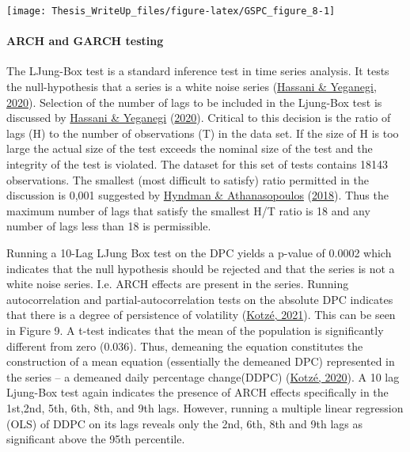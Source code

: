 \documentclass[11pt,preprint, authoryear]{elsarticle}
\let\origfigure\figure
\let\endorigfigure\endfigure
\renewenvironment{figure}[1][2] {
    \expandafter\origfigure\expandafter[H]
} {
    \endorigfigure
}
\numberwithin{equation}{section}
\numberwithin{figure}{section}
\numberwithin{table}{section}
\begin{document}
\begin{figure}[H]

{\centering \texttt{[image: Thesis\_WriteUp\_files/figure-latex/GSPC\_figure\_8-1]} 

}

\caption{stdVolControlled and absolute LogDiff \label{Figure8}}\label{fig:GSPC_figure_8}
\end{figure}

\hypertarget{arch-and-garch-testing}{%
\paragraph{\texorpdfstring{ARCH and GARCH testing
\label{ARCHandGARCH}}{ARCH and GARCH testing }}\label{arch-and-garch-testing}}

The LJung-Box test is a standard inference test in time series analysis.
It tests the null-hypothesis that a series is a white noise series
(\protect\hyperlink{ref-hassani2020selecting}{Hassani \& Yeganegi,
2020}). Selection of the number of lags to be included in the Ljung-Box
test is discussed by
\protect\hyperlink{ref-hassani2020selecting}{Hassani \& Yeganegi}
(\protect\hyperlink{ref-hassani2020selecting}{2020}). Critical to this
decision is the ratio of lags (H) to the number of observations (T) in
the data set. If the size of H is too large the actual size of the test
exceeds the nominal size of the test and the integrity of the test is
violated. The dataset for this set of tests contains 18143 observations.
The smallest (most difficult to satisfy) ratio permitted in the
discussion is 0,001 suggested by
\protect\hyperlink{ref-hyndman2018forecasting}{Hyndman \&
Athanasopoulos} (\protect\hyperlink{ref-hyndman2018forecasting}{2018}).
Thus the maximum number of lags that satisfy the smallest H/T ratio is
18 and any number of lags less than 18 is permissible.

Running a 10-Lag LJung Box test on the DPC yields a p-value of 0.0002
which indicates that the null hypothesis should be rejected and that the
series is not a white noise series. I.e. ARCH effects are present in the
series. Running autocorrelation and partial-autocorrelation tests on the
absolute DPC indicates that there is a degree of persistence of
volatility (\protect\hyperlink{ref-kotze2021volatility}{Kotzé, 2021}).
This can be seen in Figure 9. A t-test indicates that the mean of the
population is significantly different from zero (0.036). Thus, demeaning
the equation constitutes the construction of a mean equation
(essentially the demeaned DPC) represented in the series -- a demeaned
daily percentage change(DDPC)
(\protect\hyperlink{ref-kotze2020univariate}{Kotzé, 2020}). A 10 lag
Ljung-Box test again indicates the presence of ARCH effects specifically
in the 1st,2nd, 5th, 6th, 8th, and 9th lags. However, running a multiple
linear regression (OLS) of DDPC on its lags reveals only the 2nd, 6th,
8th and 9th lags as significant above the 95th percentile.
\end{document}
